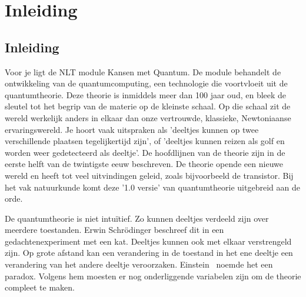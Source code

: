 \documentclass[../../main.tex]{subfiles}
\begin{document}
\onlyinsubfile{
\setcounter{chapter}{0}
}
\notinsubfile{}
\chapter{Inleiding}\label{chap:H1}

\section{Inleiding}
Voor je ligt de NLT module Kansen met Quantum. De module behandelt de ontwikkeling van de quantumcomputing, een technologie die voortvloeit uit de quantumtheorie. Deze theorie is inmiddels meer dan 100 jaar oud, en bleek de sleutel tot het begrip van de materie op de kleinste schaal. Op die schaal zit de wereld werkelijk anders in elkaar dan onze vertrouwde,  klassieke, Newtoniaanse ervaringswereld. Je hoort vaak uitspraken als 'deeltjes kunnen op twee verschillende plaatsen tegelijkertijd zijn', of 'deeltjes kunnen reizen als golf en worden weer gedetecteerd als deeltje'. 
De hoofdlijnen van de theorie zijn in de eerste helft van de twintigste eeuw beschreven. De theorie opende een nieuwe wereld en heeft tot veel uitvindingen geleid, zoals bijvoorbeeld de transistor. Bij het vak natuurkunde komt deze '1.0 versie' van quantumtheorie uitgebreid aan de orde. 

De quantumtheorie is niet intu\"itief. Zo kunnen deeltjes verdeeld zijn over meerdere toestanden. Erwin Schr\"odinger beschreef dit in een gedachtenexperiment met een kat. Deeltjes kunnen ook met elkaar verstrengeld zijn. Op grote afstand kan een verandering in de toestand in het ene deeltje een verandering van het andere deeltje veroorzaken. Einstein~\cite{Einstein1935} noemde het een paradox.  Volgens hem  moesten er nog onderliggende variabelen zijn om de theorie compleet te maken.
\end{document}
